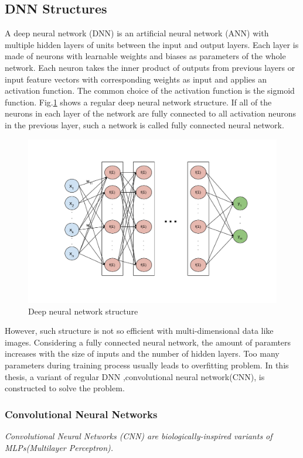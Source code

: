 \subsection{DNN Structures}
A deep neural network (DNN) is an artificial neural network (ANN) with multiple hidden layers of units between the input and output layers\cite{bengio2009learning}\cite{schmidhuber2015deep}. Each layer is made of neurons with learnable weights and biases as parameters of the whole network. Each neuron takes the inner product of outputs from previous layers or input feature vectors with corresponding weights as input and applies an activation function. The common choice of the activation function is the sigmoid function. Fig.\ref{fig:dnnstruc} shows a regular deep neural network structure. If all of the neurons in each layer of the network are fully connected to all activation neurons in the previous layer, such a network is called fully connected neural network.
\begin{figure}
	\includegraphics[scale=0.5]{../image/chapter1/dnnstruc.pdf}
	\caption{Deep neural network structure}
	\label{fig:dnnstruc}
\end{figure}

However, such structure is not so efficient with multi-dimensional data like images. Considering a fully connected neural network, the amount of paramters increases with the size of inputs and the number of hidden layers. Too many parameters during training process usually leads to overfitting problem. In this thesis, a variant of regular DNN ,convolutional neural network(CNN), is constructed to solve the problem.

\subsubsection*{Convolutional Neural Networks}
\textit{Convolutional Neural Networks (CNN) are biologically-inspired variants of MLPs(Multilayer Perceptron). }\cite{deeplrn01}

